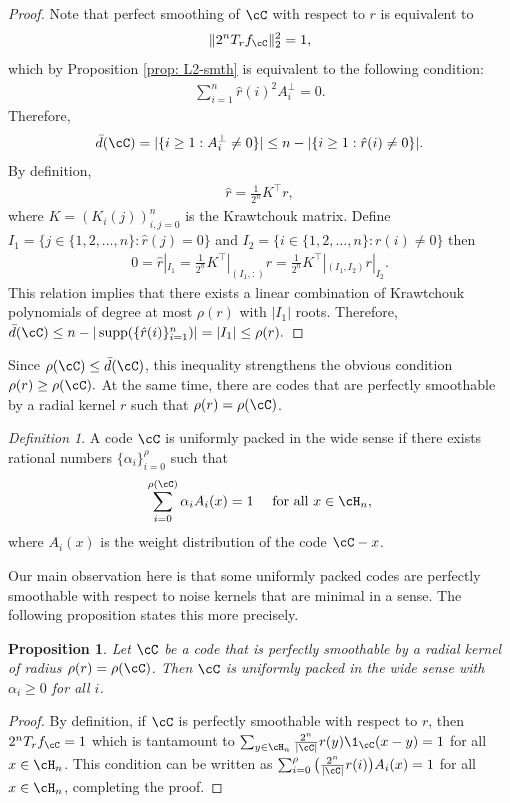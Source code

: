 \documentclass{amsart}
\newtheorem{proposition}[theorem]{Proposition}
\theoremstyle{remark}
\newtheorem{definition}{Definition}[section]
\DeclareMathOperator{\supp}{supp}
\begin{document}
\begin{proof} Note that perfect smoothing of $\cC$ with respect to $r$ is equivalent to 
\begin{align*}
    \|2^nT_rf_{\cC}\|_2^2 = 1,
\end{align*}
which  by Proposition \ref{prop: L2-smth} is equivalent to the following condition:
\begin{align*}
    \sum_{i=1}^n\hat{r}(i)^2A^\bot_i = 0.
\end{align*}
Therefore,
\begin{align*}
    \bar{d}(\cC) = |\{i\ge 1: A_i^\bot\ne0\}| \leq n - |\{i\ge 1: \hat{r}(i)\ne0\}|.
\end{align*}
 By definition,
\begin{align*}
    \hat{r} = \frac{1}{2^n} K^{\intercal}r,
\end{align*}
where $K=(K_i(j))_{i,j=0}^n$ is the Krawtchouk matrix. 
Define $I_1 = \{j\in \{1,2,\dots, n\} : \hat{r}(j) = 0 \}$ and $I_2 = \{i\in \{1,2,\dots, n\} : r(i) \neq 0 \} $
then 
\begin{align*}
    0 = \hat{r}|_{I_1} = \frac{1}{2^n}K^{\intercal}|_{(I_1,:)}r = \frac{1}{2^n} K^{\intercal}|_{(I_1,I_2)}r|_{I_2}.
\end{align*}
This relation implies that there exists a linear combination of Krawtchouk polynomials of degree at most $\rho(r)$ with $|I_1|$ roots. Therefore, $\bar{d}(\cC) \leq
n - |\supp(\{\hat{r}(i)\}_{i=1}^n)| = |I_1| \leq \rho(r).$ 
\end{proof}
Since $\rho(\cC)\le \bar d(\cC)$, this inequality strengthens the obvious condition $\rho(r) \geq \rho(\cC).$ 
At the same time, there are codes that are perfectly smoothable by a radial kernel $r$ such that $\rho(r)=\rho(\cC)$. 

\begin{definition}{\cite{semakov1971uniformly}} \label{def:UP}
A code $\cC$ is uniformly packed in the wide sense if there exists rational numbers $\{\alpha_i\}_{i=0}^{\rho}$ such that 
\begin{align*}
    \sum_{i=0}^{\rho(\cC)} \alpha_iA_i(x) = 1 \quad \text{ for all } x\in \cH_n,
\end{align*}
where $A_i(x)$ is the weight distribution of the code $\cC-x$.
\end{definition}
Our main observation here is that some uniformly packed codes are perfectly smoothable with respect to noise kernels that are minimal in a sense. The following proposition states this more precisely. 
%
\begin{proposition}\label{prop: uniformly packed codes} Let $\cC$ be a code that is perfectly smoothable 
by a radial kernel of radius $\rho(r)=\rho(\cC)$. Then $\cC$ is uniformly packed in the wide sense with
$\alpha_i\ge 0$ for all $i$.
\end{proposition}
\begin{proof}
  By definition, if $\cC$ is perfectly smoothable with respect to $r$, then $2^nT_rf_{\cC}=1$ which is tantamount to $\sum_{y \in \cH_n}\frac{2^n}{|\cC|}r(y)\1_{\cC}(x-y)= 1$ for all $x \in \cH_n$. This condition can be written as $\sum_{i=0}^{\rho}\big(\frac{2^n}{|\cC|}r(i)\big)A_i(x)= 1$ for all $x \in \cH_n$, completing the proof.
\end{proof}
\end{document}
